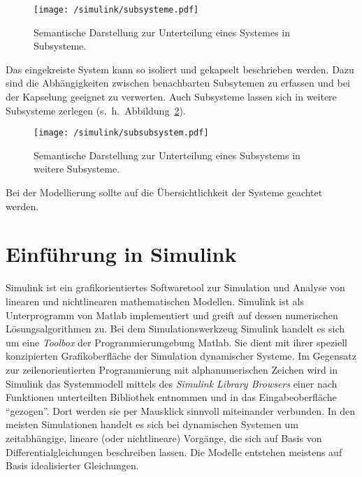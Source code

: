 \begin{figure}[h!]
	\centering
	\texttt{[image: /simulink/subsysteme.pdf]}
	\label{fig:subsysteme}
	\caption{Semantische Darstellung zur Unterteilung eines Systemes in Subsysteme.}
\end{figure}

Das eingekreiste System kann so isoliert und gekapselt beschrieben werden.
Dazu sind die Abhängigkeiten zwischen benachbarten Subsytemen zu erfassen und bei der Kapselung geeignet zu verwerten.
Auch Subsysteme lassen sich in weitere Subsysteme zerlegen (s.~h.~Abbildung~\ref{fig:subsubsysteme}).

\begin{figure}[h!]
	\centering
	\texttt{[image: /simulink/subsubsystem.pdf]}
	\label{fig:subsubsysteme}
	\caption{Semantische Darstellung zur Unterteilung eines Subsystems in weitere Subsysteme.}
\end{figure}

Bei der Modellierung sollte auf die Übersichtlichkeit der Systeme geachtet werden.

\section{Einführung in Simulink}\label{sec:simulink}

Simulink ist ein grafikorientiertes Softwaretool zur Simulation und Analyse von linearen und nichtlinearen mathematischen Modellen.
Simulink ist als Unterprogramm von Matlab implementiert und greift auf dessen numerischen Lösungsalgorithmen zu.
Bei dem Simulationswerkzeug Simulink handelt es sich um eine \emph{Toolbox} der Programmierumgebung Matlab.
Sie dient mit ihrer speziell konzipierten Grafikoberfläche der Simulation dynamischer Systeme.
Im Gegensatz zur zeilenorientierten Programmierung mit alphanumerischen Zeichen wird in Simulink das Systemmodell mittels des \emph{Simulink Library Browsers} einer nach Funktionen unterteilten Bibliothek entnommen und in das Eingabeoberfläche \enquote{gezogen}.
Dort werden sie per Mausklick sinnvoll miteinander verbunden.
In den meisten Simulationen handelt es sich bei dynamischen Systemen um zeitabhängige, lineare (oder nichtlineare) Vorgänge, die sich auf Basis von Differentialgleichungen beschreiben lassen.
Die Modelle entstehen meistens auf Basis idealisierter Gleichungen.

